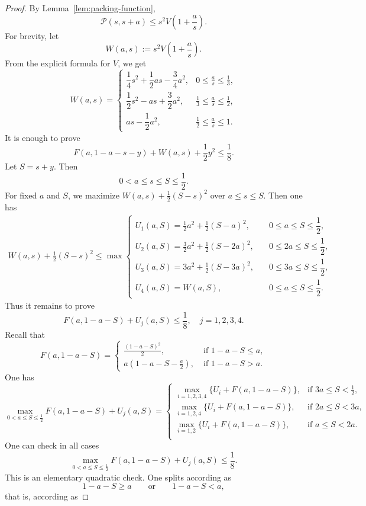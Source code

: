 \documentclass[runningheads,envcountsame,a4paper]{llncs}
\begin{document}
\begin{proof}
By Lemma~\ref{lem:packing-function},
\[
\mathcal P(s,s+a)\le s^2V\left(1+\frac{a}{s}\right).
\]
For brevity, let
\[
W(a,s):=s^2V\left(1+\frac{a}{s}\right).
\]
From the explicit formula for \(V\), we get
\[
W(a,s)=
\begin{cases}
\dfrac14s^2+\dfrac12as-\dfrac34a^2,
& 0\le \frac{a}{s}\le \frac{1}{3},\\[8pt]
\dfrac12s^2-as+\dfrac32a^2,
&\frac{1}{3}\le \frac{a}{s}\le \frac{1}{2},\\[8pt]
as-\dfrac12a^2,
& \frac{1}{2}\le \frac{a}{s}\le 1.
\end{cases}
\]
It is enough to prove
\[
F(a,1-a-s-y)+W(a,s)+\frac12y^2\le \frac18.
\]
Let
\(S=s+y.\)
Then
\[
0<a\le s\le S\le \frac12.
\]
For fixed \(a\) and \(S\), we maximize $W(a,s)+\frac12(S-s)^2$ over $a\le s\le S$. Then 
one has
\begin{align*}
W(a,s)+\frac12(S-s)^2\le\max
\begin{cases}
U_1(a,S)=\frac12a^2+\frac12(S-a)^2,\quad &0\le a\le S\le \dfrac12,\\ 
U_2(a,S)=\frac32a^2+\frac12(S-2a)^2,\quad &0\le 2a\le S\le \dfrac12,\\
U_3(a,S)=3a^2+\frac12(S-3a)^2,\quad &0\le 3a\le S\le \dfrac12,\\
U_4(a,S)=W(a,S), \quad &0\le a\le S\le \dfrac12.
\end{cases}
\end{align*}
Thus it remains to prove
\[
F(a,1-a-S)+U_j(a,S)\le \frac18,\quad j=1,2,3,4.
\]
Recall that $$F(a,1-a-S)=\begin{cases}
    \frac{(1-a-S)^2}{2},& \; \text{if $1-a-S\le a$},\\
    a(1-a-S- \frac{a}{2}),& \; \text{if $1-a-S> a$}.
\end{cases}$$
One has
$$\max_{0<a\le S \le \frac{1}{2} } F(a,1-a-S)+U_j(a,S)=\begin{cases}
    \max_{i=1,2,3,4} \{U_i+F(a,1-a-S)\},& \text{if $3a \le S<\frac{1}{2}$},\\
    \max_{i=1,2,4} \{U_i+F(a,1-a-S)\},& \text{if $2a \le S<3a$},\\
    \max_{i=1,2} \{U_i+F(a,1-a-S)\},& \text{if $a \le S<2a$}.\\
\end{cases}$$
One can check in all cases$$\max_{0<a\le S \le \frac{1}{2} } F(a,1-a-S)+U_j(a,S) \le \frac{1}{8}.$$ 
\iffalse
This is an elementary quadratic check.  One splits according as
\[
1-a-S\ge a
\qquad\text{or}\qquad
1-a-S<a,
\]
that is, according as

\end{proof}
\end{document}

